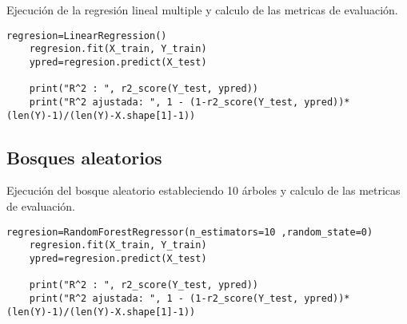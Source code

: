 \documentclass[conference]{IEEEtran}
\begin{document}
Ejecución de la regresión lineal multiple y calculo de las metricas de evaluación. 
\begin{lstlisting}[frame=single]
    regresion=LinearRegression()
    regresion.fit(X_train, Y_train)
    ypred=regresion.predict(X_test)

    print("R^2 : ", r2_score(Y_test, ypred))
    print("R^2 ajustada: ", 1 - (1-r2_score(Y_test, ypred))*(len(Y)-1)/(len(Y)-X.shape[1]-1))
\end{lstlisting}

\subsection{Bosques aleatorios}
Ejecución del bosque aleatorio estableciendo 10 árboles y calculo de las metricas de evaluación. 
\begin{lstlisting}[frame=single]
    regresion=RandomForestRegressor(n_estimators=10 ,random_state=0) 
    regresion.fit(X_train, Y_train)
    ypred=regresion.predict(X_test)
    
    print("R^2 : ", r2_score(Y_test, ypred))
    print("R^2 ajustada: ", 1 - (1-r2_score(Y_test, ypred))*(len(Y)-1)/(len(Y)-X.shape[1]-1))

\end{lstlisting}
\end{document}
